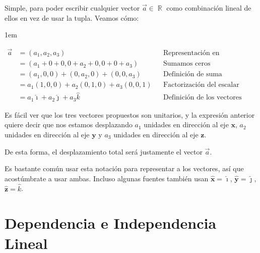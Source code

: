 \documentclass[12pt, fleqn]{report}                             %
\newenvironment{SmallIndentation}[1][0.75em]                    %
        {\begin{adjustwidth}{#1}{}\begin{footnotesize}}             %
        {\end{footnotesize}\end{adjustwidth}}                       %
\theoremstyle{break}                                            %
\DeclareMathOperator \Reals        {\mathbb{R}}                 %
\newcommand{\hati}      {\hat{\imath}}                           %
\newcommand{\hatj}      {\hat{\jmath}}                           %
\newcommand{\hatk}      {\hat{k}}                                %
\newcommand{\uVec}[1]   {\mathbf{\hat{#1}}}                     %
\begin{document}
                    Simple, para poder escribir cualquier vector $\vec{a} \in \Reals$ como combinación
                    lineal de ellos en vez de usar la tupla.
                    Veamos cómo:
                    \begin{SmallIndentation}[1em]
                        \begin{align*}
                            \vec{a}
                                &= (a_1, a_2, a_3)                               &&\mbox{Representación en coordenadas}        \\
                                &= (a_1 + 0 + 0, 0 + a_2 + 0, 0 + 0 + a_3)       &&\mbox{Sumamos ceros convenientemente}       \\
                                &= (a_1, 0, 0) + (0, a_2, 0) + (0, 0, a_3)       &&\mbox{Definición de suma}                   \\
                                &= a_1(1, 0, 0) + a_2(0, 1, 0) + a_3(0, 0, 1)    &&\mbox{Factorización del escalar}            \\
                                &= a_1\hati + a_2\hatj + a_3\hatk          &&\mbox{Definición de los vectores canónicos}
                        \end{align*}
                    \end{SmallIndentation}
                
                    Es fácil ver que los tres vectores propuestos son unitarios, y la expresión anterior
                    quiere decir que nos estamos desplazando $a_1$ unidades en dirección al eje $\mathbf{x}$,
                    $a_2$ unidades en dirección al eje $\mathbf{y}$ y $a_3$ unidades en dirección al eje
                    $\mathbf{z}$.

                    De esta forma, el desplazamiento total será justamente el vector $\vec{a}$.
                    
                    Es bastante común usar esta notación para representar a los vectores, así que acostúmbrate a usar ambas. 
                    Incluso algunas fuentes también usan $\uVec{x} = \hati$, $\uVec{y} = \hatj$, $\uVec{z} = \hatk$.




        \clearpage
        \section{Dependencia e Independencia Lineal}
            
\end{document}
